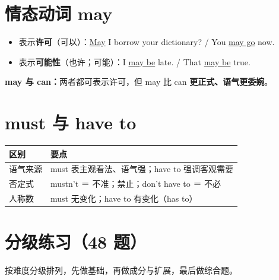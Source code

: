 \documentclass[11pt,a4paper]{ctexart}
\begin{document}
\section{情态动词 may}
\begin{itemize}[leftmargin=1.4em]
\item 表示\textbf{许可}（可以）：\underline{May} I borrow your dictionary? / You \underline{may go} now.
\item 表示\textbf{可能性}（也许；可能）：I \underline{may be} late. / That \underline{may be} true.
\end{itemize}
\textbf{may 与 can：}两者都可表示许可，但 may 比 can \textbf{更正式、语气更委婉}。

\section{must 与 have to}
\begin{center}
\begin{tabular}{p{3.4cm}p{9.0cm}}
\hline
\textbf{区别} & \textbf{要点}\\
\hline
语气来源 & must 表主观看法、语气强；have to 强调客观需要\\
否定式 & mustn't ＝ 不准；禁止；don't have to ＝ 不必\\
人称数 & must 无变化；have to 有变化（has to）\\
\hline
\end{tabular}
\end{center}


\newpage
\section{分级练习（48 题）}
\noindent 按难度分级排列，先做基础，再做成分与扩展，最后做综合题。
\end{document}
